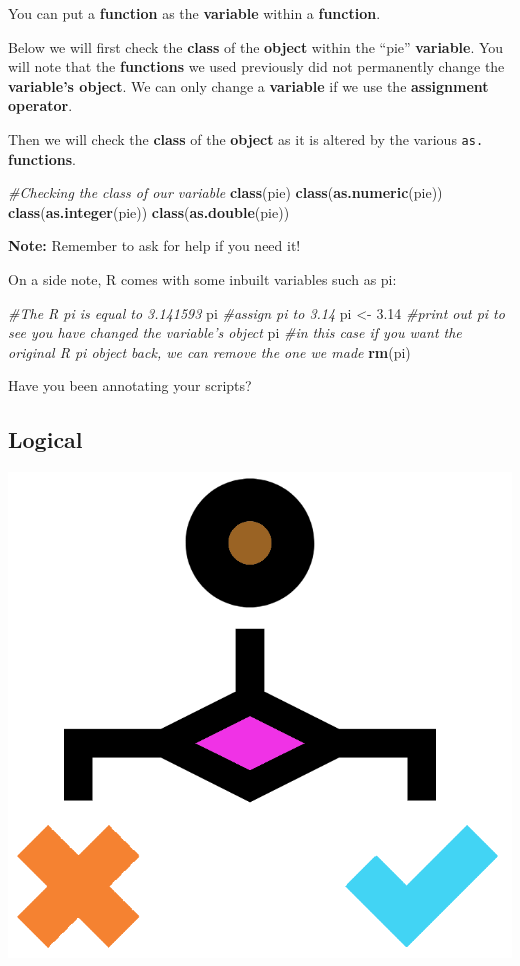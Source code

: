\documentclass[]{book}
\newenvironment{Shaded}{\begin{snugshade}}{\end{snugshade}}
\newcommand{\KeywordTok}[1]{\textcolor[rgb]{0.13,0.29,0.53}{\textbf{#1}}}
\newcommand{\FloatTok}[1]{\textcolor[rgb]{0.00,0.00,0.81}{#1}}
\newcommand{\StringTok}[1]{\textcolor[rgb]{0.31,0.60,0.02}{#1}}
\newcommand{\CommentTok}[1]{\textcolor[rgb]{0.56,0.35,0.01}{\textit{#1}}}
\newcommand{\NormalTok}[1]{#1}
\begin{document}
You can put a \textbf{function} as the \textbf{variable} within a
\textbf{function}.

Below we will first check the \textbf{class} of the \textbf{object}
within the ``pie'' \textbf{variable}. You will note that the
\textbf{functions} we used previously did not permanently change the
\textbf{variable's object}. We can only change a \textbf{variable} if we
use the \textbf{assignment operator}.

Then we will check the \textbf{class} of the \textbf{object} as it is
altered by the various \texttt{as.} \textbf{functions}.

\begin{Shaded}
\begin{Highlighting}[]
\CommentTok{#Checking the class of our variable}
\KeywordTok{class}\NormalTok{(pie)}
\KeywordTok{class}\NormalTok{(}\KeywordTok{as.numeric}\NormalTok{(pie))}
\KeywordTok{class}\NormalTok{(}\KeywordTok{as.integer}\NormalTok{(pie))}
\KeywordTok{class}\NormalTok{(}\KeywordTok{as.double}\NormalTok{(pie))}
\end{Highlighting}
\end{Shaded}

\textbf{Note:} Remember to ask for help if you need it!

On a side note, R comes with some inbuilt variables such as pi:

\begin{Shaded}
\begin{Highlighting}[]
\CommentTok{#The R pi is equal to 3.141593}
\NormalTok{pi}
\CommentTok{#assign pi to 3.14}
\NormalTok{pi <-}\StringTok{ }\FloatTok{3.14}
\CommentTok{#print out pi to see you have changed the variable's object}
\NormalTok{pi}
\CommentTok{#in this case if you want the original R pi object back, we can remove the one we made}
\KeywordTok{rm}\NormalTok{(pi)}
\end{Highlighting}
\end{Shaded}

Have you been annotating your scripts?

\subsection{Logical}\label{logical}

\begin{center}\includegraphics[width=0.2\linewidth]{figures/logical} \end{center}
\end{document}
